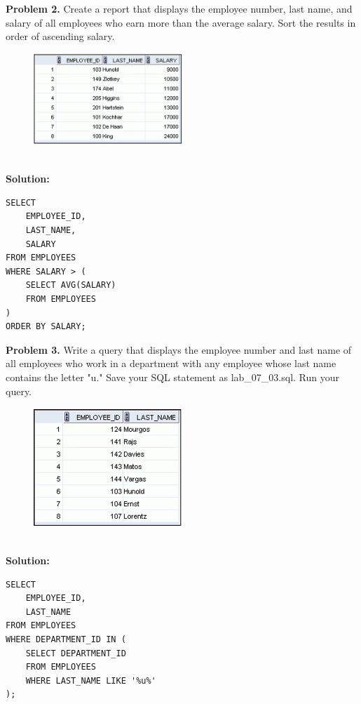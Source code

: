 \documentclass[12pt,a4paper]{article}
\begin{document}
\vspace{0.5cm}

\textbf{Problem 2.} Create a report that displays the employee number, last name, and salary of all employees who earn more than the average salary. Sort the results in order of ascending salary.
\begin{figure}[htbp]
  \centering
  \includegraphics[width=0.5\textwidth]{Screenshots/72.png}
\end{figure}\\
\newpage
\textbf{Solution:}
\begin{lstlisting}[style=sqlstyle]
SELECT 
    EMPLOYEE_ID,
    LAST_NAME,
    SALARY
FROM EMPLOYEES
WHERE SALARY > (
    SELECT AVG(SALARY)
    FROM EMPLOYEES
)
ORDER BY SALARY;
\end{lstlisting}

\vspace{0.5cm}

\textbf{Problem 3.} Write a query that displays the employee number and last name of all employees who work in a department with any employee whose last name contains the letter "u." Save your SQL statement as lab\_07\_03.sql. Run your query.
\begin{figure}[htbp]
  \centering
  \includegraphics[width=0.5\textwidth]{Screenshots/73.png}
\end{figure}\\
\textbf{Solution:}
\begin{lstlisting}[style=sqlstyle]
SELECT 
    EMPLOYEE_ID,
    LAST_NAME
FROM EMPLOYEES
WHERE DEPARTMENT_ID IN (
    SELECT DEPARTMENT_ID
    FROM EMPLOYEES
    WHERE LAST_NAME LIKE '%u%'
);
\end{lstlisting}
\end{document}
